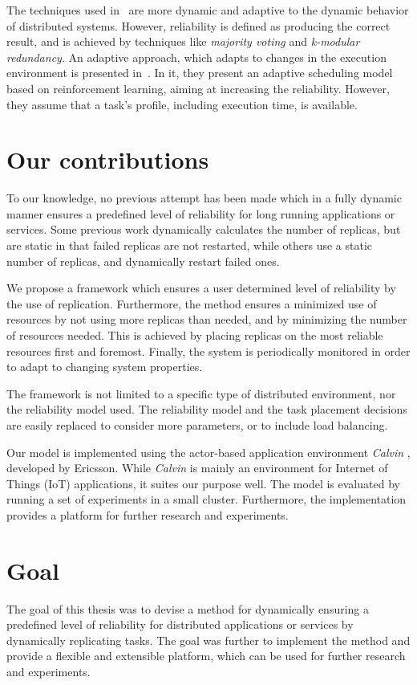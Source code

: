 \documentclass{cslthse-msc}
\begin{document}
The techniques used in~\cite{selfAdaptRel, dynAdaptRepl, relModelWebServices} are more dynamic and adaptive to the dynamic behavior of distributed systems. However, reliability is defined as producing the correct result, and is achieved by techniques like \emph{majority voting} and \emph{k-modular redundancy}. An adaptive approach, which adapts to changes in the execution environment is presented in~\cite{imprRelAdaptRL}. In it, they present an adaptive scheduling model based on reinforcement learning, aiming at increasing the reliability. However, they assume that a task's profile, including execution time, is available.

\section{Our contributions} \label{sec:introduction_contributions}
To our knowledge, no previous attempt has been made which in a fully dynamic manner ensures a predefined level of reliability for long running applications or services. Some previous work dynamically calculates the number of replicas, but are static in that failed replicas are not restarted, while others use a static number of replicas, and dynamically restart failed ones.

We propose a framework which ensures a user determined level of reliability by the use of replication. Furthermore, the method ensures a minimized use of resources by not using more replicas than needed, and by minimizing the number of resources needed. This is achieved by placing replicas on the most reliable resources first and foremost. Finally, the system is periodically monitored in order to adapt to changing system properties.

The framework is not limited to a specific type of distributed environment, nor the reliability model used. The reliability model and the task placement decisions are easily replaced to consider more parameters, or to include load balancing. 

Our model is implemented using the actor-based application environment \emph{Calvin} \cite{calvin}, developed by Ericsson. While \emph{Calvin} is mainly an environment for Internet of Things (IoT) applications, it suites our purpose well. The model is evaluated by running a set of experiments in a small cluster. Furthermore, the implementation provides a platform for further research and experiments.

\section{Goal} \label{sec:introduction_goals}
The goal of this thesis was to devise a method for dynamically ensuring a predefined level of reliability for distributed applications or services by dynamically replicating tasks. The goal was further to implement the method and provide a flexible and extensible platform, which can be used for further research and experiments.
\end{document}
